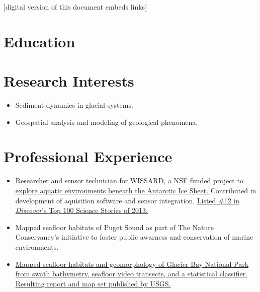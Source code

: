 \documentclass{cv_TOH}
\begin{document}
\vspace{-0.2cm}
\centerline{\footnotesize{[digital version of this document embeds links]}}

\section{Education}

\section{Research Interests}
\begin{itemize}
\item Sediment dynamics in glacial systems.
\item Geospatial analysis and modeling of geological phenomena.
\end{itemize}

\section{Professional Experience}

\begin{itemize}
\item \href{http://www.wissard.org}{Researcher and sensor technician for WISSARD, a NSF funded project to explore aquatic environments beneath the Antarctic Ice Sheet. }Contributed in development of aquisition software and sensor integration. \href{http://discovermagazine.com/2014/jan-feb/12-the-search-for-life-trapped-under-ice}{Listed \#12 in \textit{Discover}'s Top 100 Science Stories of 2013.}
\item Mapped seafloor habitats of Puget Sound as part of The Nature Conservancy's initiative to foster public awarness and conservation of marine environments.
\item \href{http://pubs.usgs.gov/sim/3253/}{Mapped seafloor habitats and geomorphology of Glacier Bay National Park from swath bathymetry, seafloor video transects, and a statistical classifier. Resulting report and map set published by USGS.}
\end{itemize}
\end{document}
